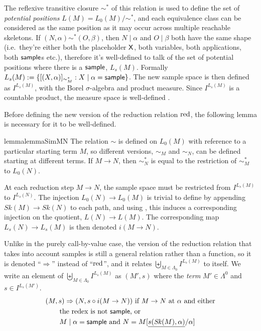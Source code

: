 The reflexive transitive closure $\sim^*$ of this relation is used to define the set of \emph{potential positions} $L(M) = L_0(M) / \sim^*$, and each equivalence class can be considered as the same position as it may occur across multiple reachable skeletons. 
If $(N,\alpha) \sim^* (O,\beta)$, then $N \mid \alpha$ and $O \mid \beta$ both have the same shape (i.e.~they're either both the placeholder $\mathsf{X}$, both variables, both applications, both $\mathsf{sample}$s etc.), therefore it's well-defined to talk of the set of potential positions where there is a $\mathsf{sample}$, $L_s(M)$. 
Formally $L_s(M) := \{[(X, \alpha)]_{\sim^\ast_M} : X \mid \alpha = \mathsf{sample}\}$.
The new sample space is then defined as $I^{L_s(M)}$, with the Borel $\sigma$-algebra and product measure.
Since $I^{L_s(M)}$ is a countable product, the measure space is well-defined \cite[Cor.~2.7.3]{AshDD00}.

\medskip
Before defining the new version of the reduction relation $\operatorname{red}$, the following lemma is necessary for it to be well-defined.

\begin{restatable}{lemma}{lemmaSimMN}
\label{lem:sim-M-N}
The relation $\sim$ is defined on $L_0(M)$ with reference to a particular starting term $M$, so different versions, $\sim_M$ and $\sim_N$, can be defined starting at different terms. If $M \to N$, then $\sim^*_N$ is equal to the restriction of $\sim^*_M$ to $L_0(N)$.
\end{restatable} 


At each reduction step $M \to N$, the sample space must be restricted from $I^{L_s(M)}$ to $I^{L_s(N)}$. 
The injection $L_0(N) \to L_0(M)$ is trivial to define by appending $\mathit{Sk}(M) \to \mathit{Sk}(N)$ to each path, and using , this induces a corresponding injection on the quotient, $L(N) \to L(M)$. 
The corresponding map $L_s(N) \to L_s(M)$ is then denoted $i(M \to N)$.

\begin{definition}
Unlike in the purely call-by-value case, the version of the reduction relation that takes into account samples is still a general relation rather than a function, so it is denoted ``$\Rightarrow$'' instead of ``$\operatorname{red}$'', and it relates $\biguplus_{M \in \Lambda_0} I^{L_s(M)}$ to itself.
We write an element of $\biguplus_{M \in \Lambda_0} I^{L_s(M)}$ as $(M', s)$ where the \emph{term} $M' \in \Lambda^0$ and $s \in  I^{L_s(M')}$.
\begin{align*}
& (M,s) \Rightarrow (N,s \circ i(M \to N)) \text{ if $M \to N$ at $\alpha$ and either} \\
& \qquad \text{the redex is not $\mathsf{sample}$, or} \\
& \qquad \text{$M \mid \alpha = \mathsf{sample}$ and $N = M[\underline{s(\mathit{Sk}(M),\alpha)}/\alpha]$}
\end{align*}
\end{definition}

